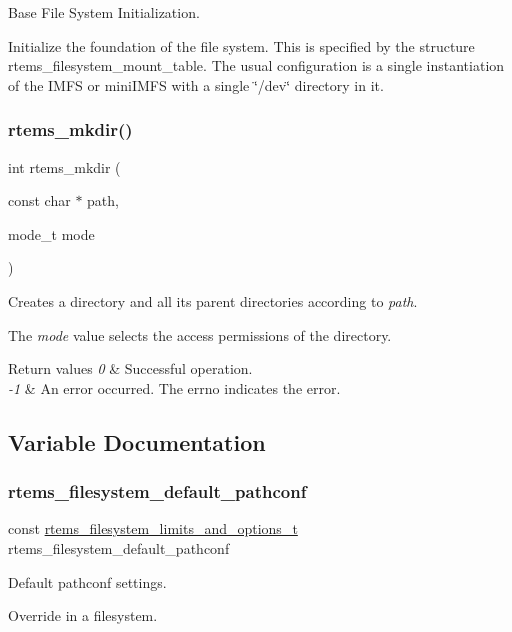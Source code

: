 Base File System Initialization. 

Initialize the foundation of the file system. This is specified by the structure rtems\+\_\+filesystem\+\_\+mount\+\_\+table. The usual configuration is a single instantiation of the I\+M\+FS or mini\+I\+M\+FS with a single \char`\"{}/dev\char`\"{} directory in it. \mbox{\label{group__LibIO_gad15bb6c81ba9ed35ec75103d13bde734}} 
\subsubsection{\texorpdfstring{rtems\_mkdir()}{rtems\_mkdir()}}
{\footnotesize\ttfamily int rtems\+\_\+mkdir (\begin{DoxyParamCaption}\item[{const char $\ast$}]{path,  }\item[{mode\+\_\+t}]{mode }\end{DoxyParamCaption})}



Creates a directory and all its parent directories according to {\itshape path}. 

The {\itshape mode} value selects the access permissions of the directory.


\begin{DoxyRetVals}{Return values}
{\em 0} & Successful operation. \\
\hline
{\em -\/1} & An error occurred. The {\ttfamily errno} indicates the error. \\
\hline
\end{DoxyRetVals}


\subsection{Variable Documentation}
\mbox{\label{group__LibIO_gaf623825fb7bd37d1ba06849b57e29db4}} 
\subsubsection{\texorpdfstring{rtems\_filesystem\_default\_pathconf}{rtems\_filesystem\_default\_pathconf}}
{\footnotesize\ttfamily const \mbox{\hyperlink{structrtems__filesystem__limits__and__options__t}{rtems\+\_\+filesystem\+\_\+limits\+\_\+and\+\_\+options\+\_\+t}} rtems\+\_\+filesystem\+\_\+default\+\_\+pathconf}



Default pathconf settings. 

Override in a filesystem. 
